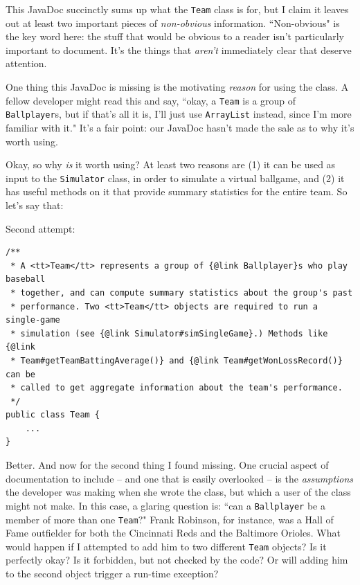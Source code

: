This JavaDoc succinctly sums up what the \texttt{Team} class is for, but I
claim it leaves out at least two important pieces of \textit{non-obvious}
information. ``Non-obvious" is the key word here: the stuff that would be
obvious to a reader isn't particularly important to document. It's the things
that \textit{aren't} immediately clear that deserve attention.

One thing this JavaDoc is missing is the motivating \textit{reason} for using
the class. A fellow developer might read this and say, ``okay, a \texttt{Team}
is a group of \texttt{Ballplayer}s, but if that's all it is, I'll just use
\texttt{ArrayList} instead, since I'm more familiar with it." It's a fair
point: our JavaDoc hasn't made the sale as to why it's worth using.

Okay, so why \textit{is} it worth using? At least two reasons are (1) it can
be used as input to the \texttt{Simulator} class, in order to simulate a
virtual ballgame, and (2) it has useful methods on it that provide summary
statistics for the entire team. So let's say that:

Second attempt:
\vspace{-.15in}
\begin{Verbatim}[fontsize=\footnotesize,samepage=true,frame=single]
/**
 * A <tt>Team</tt> represents a group of {@link Ballplayer}s who play baseball
 * together, and can compute summary statistics about the group's past
 * performance. Two <tt>Team</tt> objects are required to run a single-game
 * simulation (see {@link Simulator#simSingleGame}.) Methods like {@link 
 * Team#getTeamBattingAverage()} and {@link Team#getWonLossRecord()} can be 
 * called to get aggregate information about the team's performance.
 */
public class Team {
    ...
}
\end{Verbatim}

Better. And now for the second thing I found missing. One crucial aspect of
documentation to include -- and one that is easily overlooked -- is the
\textit{assumptions} the developer was making when she wrote the class, but
which a user of the class might not make. In this case, a glaring question is:
``can a \texttt{Ballplayer} be a member of more than one \texttt{Team}?" Frank
Robinson, for instance, was a Hall of Fame outfielder for both the Cincinnati
Reds and the Baltimore Orioles. What would happen if I attempted to add him to
two different \texttt{Team} objects? Is it perfectly okay? Is it forbidden,
but not checked by the code? Or will adding him to the second object trigger a
run-time exception?

